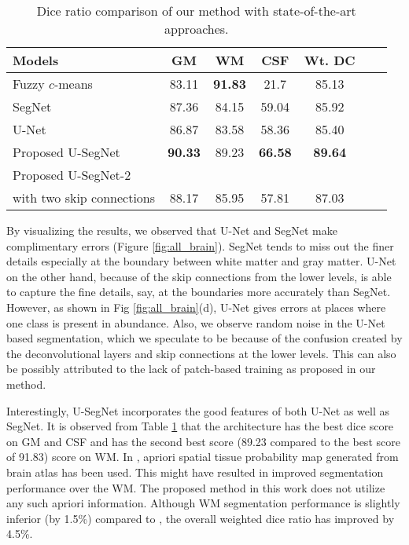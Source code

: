 \documentclass{article}
\begin{document}
\renewcommand{\tabcolsep}{0.08cm}
\begin{table}[!ht]
\centering
\begin{tabular}{l c c c c c c}
\toprule[0.2mm]
\textbf{Models}  & \textbf{GM}   & \textbf{WM}   &   \textbf{CSF} & \textbf{Wt. DC} \\
\midrule
Fuzzy $c$-means \cite{1} & 83.11 & \textbf{91.83} & 21.7 & 85.13 \\
\midrule

SegNet \cite{badrinarayanan2017segnet} & 87.36 & 84.15 & 59.04 & 85.92\\
\midrule

U-Net \cite{u-net} & 86.87& 83.58 & 58.36 & 85.40 \\
\midrule

Proposed U-SegNet & \textbf{90.33} & 89.23 & \textbf{66.58} & \textbf{89.64}\\
\midrule

Proposed U-SegNet-2 \\ with two skip connections & 88.17 & 85.95 & 57.81 & 87.03  \\
\bottomrule[0.2mm]
\end{tabular}
\caption{Dice ratio comparison of our method with state-of-the-art approaches. }
\label{table:datasets}
\end{table}

By visualizing the results, we observed that U-Net and SegNet make complimentary errors (Figure \ref{fig:all_brain}). SegNet tends to miss out the finer details especially at the boundary between white matter and gray matter. U-Net on the other hand, because of the skip connections from the lower levels, is able to capture the fine details, say, at the boundaries more accurately than SegNet. However, as shown in Fig \ref{fig:all_brain}(d), U-Net gives errors at places where one class is present in abundance. Also, we observe random noise in the U-Net based segmentation, which we speculate to be because of the confusion created by the deconvolutional layers and skip connections at the lower levels. This can also be possibly attributed to the lack of patch-based training as proposed in our method.

Interestingly, U-SegNet incorporates the good features of both U-Net as well as SegNet. It is observed from Table \ref{table:datasets} that the architecture has the best dice score on GM and CSF and has the second best score (89.23 compared to the best score of 91.83) score on WM. In \cite{1}, apriori spatial tissue probability map generated from brain atlas has been used. This might have resulted in improved segmentation performance over the WM. The proposed method in this work does not utilize any such apriori information. Although WM segmentation performance is slightly inferior (by 1.5\%) compared to \cite{1}, the overall weighted dice ratio has  improved by 4.5\%.
\end{document}
